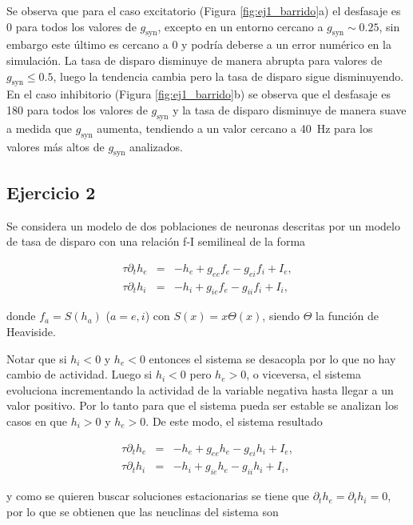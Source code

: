 \documentclass[11pt, twocolumn]{article}
\begin{document}
Se observa que para el caso excitatorio (Figura \ref{fig:ej1_barrido}a) el desfasaje es 0 para todos los valores de \(g_\text{syn}\), excepto en un entorno cercano a \(g_\text{syn} \sim 0.25\), sin embargo este último es cercano a 0 y podría deberse a un error numérico en la simulación. La tasa de disparo disminuye de manera abrupta para valores de \(g_\text{syn} \leq 0.5\), luego la tendencia cambia pero la tasa de disparo sigue disminuyendo. En el caso inhibitorio (Figura \ref{fig:ej1_barrido}b) se observa que el desfasaje es 180 para todos los valores de \(g_\text{syn}\) y la tasa de disparo disminuye de manera suave a medida que \(g_\text{syn}\) aumenta, tendiendo a un valor cercano a \SI{40}{\hertz} para los valores más altos de \(g_\text{syn}\) analizados.


\subsection*{Ejercicio 2}
Se considera un modelo de dos poblaciones de neuronas descritas por un modelo de tasa de disparo con una relación f-I semilineal de la forma 

\begin{eqnarray*}
    \tau \partial_t h_e  &=& -h_e + g_{ee} f_e - g_{ei} f_i + I_e, \\
    \tau \partial_t h_i  &=& -h_i + g_{ie} f_e - g_{ii} f_i + I_i,
\end{eqnarray*}

\noindent donde \(f_a = S(h_a)\) (\(a = e, i\)) con \(S(x) = x \Theta(x)\), siendo \(\Theta\) la función de Heaviside. 

Notar que si \(h_i < 0\) y \(h_e < 0\) entonces el sistema se desacopla por lo que no hay cambio de actividad. Luego si \(h_i < 0\) pero \(h_e > 0\), o viceversa, el sistema evoluciona incrementando la actividad de la variable negativa hasta llegar a un valor positivo. Por lo tanto para que el sistema pueda ser estable se analizan los casos en que \(h_i > 0\) y \(h_e > 0\). De este modo, el sistema resultado

\begin{eqnarray*}
    \tau \partial_t h_e  &=& -h_e + g_{ee} h_e - g_{ei} h_i + I_e, \\
    \tau \partial_t h_i  &=& -h_i + g_{ie} h_e - g_{ii} h_i + I_i,
\end{eqnarray*}

\noindent y como se quieren buscar soluciones estacionarias se tiene que \(\partial_t h_e = \partial_t h_i = 0\), por lo que se obtienen que las neuclinas del sistema son
\end{document}
